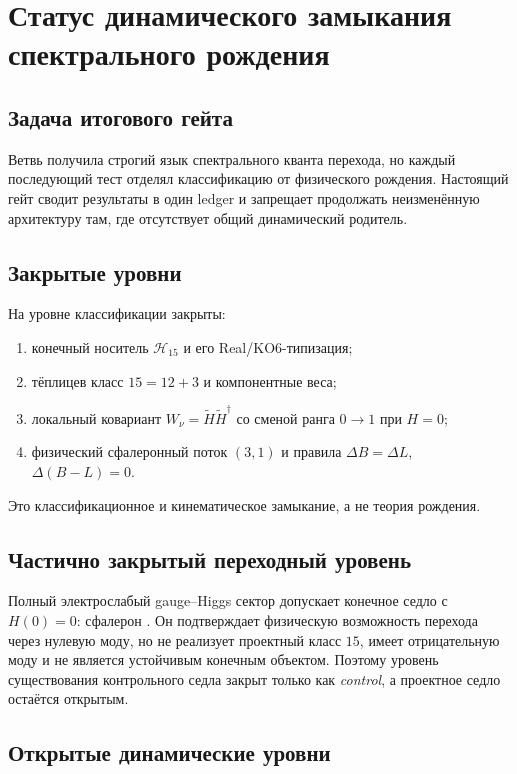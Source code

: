 \chapter{Статус динамического замыкания спектрального рождения}
\label{ch:v6-spectral-transition-dynamic-closure-status-gate}

\section{Задача итогового гейта}

Ветвь получила строгий язык спектрального кванта перехода, но каждый
последующий тест отделял классификацию от физического рождения. Настоящий
гейт сводит результаты в один ledger и запрещает продолжать неизменённую
архитектуру там, где отсутствует общий динамический родитель.

\section{Закрытые уровни}

На уровне классификации закрыты:
\begin{enumerate}
 \item конечный носитель $\mathcal H_{15}$ и его Real/KO6-типизация;
 \item тёплицев класс $15=12+3$ и компонентные веса;
 \item локальный ковариант $W_\nu=\widetilde H\widetilde H^\dagger$ со
 сменой ранга $0\to1$ при $H=0$;
 \item физический сфалеронный поток $(3,1)$ и правила
 $\Delta B=\Delta L$, $\Delta(B-L)=0$.
\end{enumerate}
Это классификационное и кинематическое замыкание, а не теория рождения.

\section{Частично закрытый переходный уровень}

Полный электрослабый gauge--Higgs сектор допускает конечное седло с
$H(0)=0$: сфалерон \cite{dynamic-status-klinkhamer-manton1984}.
Он подтверждает физическую возможность перехода через нулевую моду, но
не реализует проектный класс $15$, имеет отрицательную моду и не является
устойчивым конечным объектом. Поэтому уровень существования контрольного
седла закрыт только как \emph{control}, а проектное седло остаётся открытым.

\section{Открытые динамические уровни}


